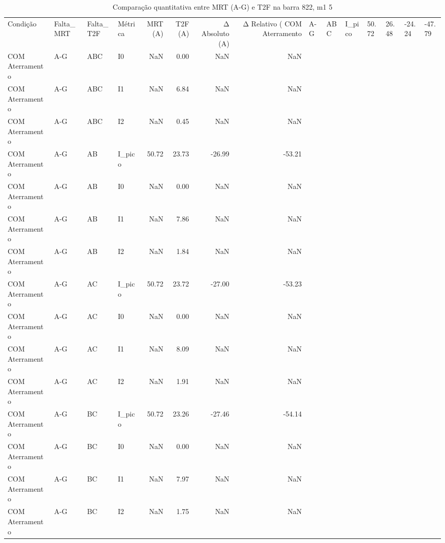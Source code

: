 \begin{table}[htbp]
\centering
\caption{Comparação quantitativa entre MRT (A-G) e T2F na barra 822, m1 5}
\label{tab:comparacao_t2f_mrt_cap4}
\begin{tabular}{llllrrrr}
\toprule
Condição & Falta_MRT & Falta_T2F & Métrica & MRT (A) & T2F (A) & Δ Absoluto (A) & Δ Relativo (%
\midrule
COM Aterramento & A-G & ABC & I_pico & 50.72 & 26.48 & -24.24 & -47.79 \\
COM Aterramento & A-G & ABC & I0 & NaN & 0.00 & NaN & NaN \\
COM Aterramento & A-G & ABC & I1 & NaN & 6.84 & NaN & NaN \\
COM Aterramento & A-G & ABC & I2 & NaN & 0.45 & NaN & NaN \\
COM Aterramento & A-G & AB & I_pico & 50.72 & 23.73 & -26.99 & -53.21 \\
COM Aterramento & A-G & AB & I0 & NaN & 0.00 & NaN & NaN \\
COM Aterramento & A-G & AB & I1 & NaN & 7.86 & NaN & NaN \\
COM Aterramento & A-G & AB & I2 & NaN & 1.84 & NaN & NaN \\
COM Aterramento & A-G & AC & I_pico & 50.72 & 23.72 & -27.00 & -53.23 \\
COM Aterramento & A-G & AC & I0 & NaN & 0.00 & NaN & NaN \\
COM Aterramento & A-G & AC & I1 & NaN & 8.09 & NaN & NaN \\
COM Aterramento & A-G & AC & I2 & NaN & 1.91 & NaN & NaN \\
COM Aterramento & A-G & BC & I_pico & 50.72 & 23.26 & -27.46 & -54.14 \\
COM Aterramento & A-G & BC & I0 & NaN & 0.00 & NaN & NaN \\
COM Aterramento & A-G & BC & I1 & NaN & 7.97 & NaN & NaN \\
COM Aterramento & A-G & BC & I2 & NaN & 1.75 & NaN & NaN \\
\bottomrule
\end{tabular}
\end{table}
